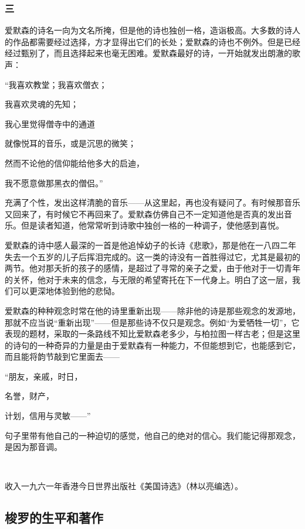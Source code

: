 \subsubsection*{三}
\par 爱默森的诗名一向为文名所掩，但是他的诗也独创一格，造诣极高。大多数的诗人的作品都需要经过选择，方才显得出它们的长处；爱默森的诗也不例外。但是已经经过甄别了，而且选择起来也毫无困难。爱默森最好的诗，一开始就发出朗澈的歌声：
\par “我喜欢教堂；我喜欢僧衣；
\par 我喜欢灵魂的先知；
\par 我心里觉得僧寺中的通道
\par 就像悦耳的音乐，或是沉思的微笑；
\par 然而不论他的信仰能给他多大的启迪，
\par 我不愿意做那黑衣的僧侣。”
\par 充满了个性，发出这样清脆的音乐——从这里起，再也没有疑问了。有时候那音乐又回来了，有时候它不再回来了。爱默森仿佛自己不一定知道他是否真的发出音乐。但是读者知道，他常常听到诗歌中独创一格的一种调子，使他感到喜悦。
\par 爱默森的诗中感人最深的一首是他追悼幼子的长诗《悲歌》，那是他在一八四二年失去一个五岁的儿子后挥泪完成的。这一类的诗没有一首胜得过它，尤其是最初的两节。他对那夭折的孩子的感情，是超过了寻常的亲子之爱，由于他对于一切青年的关怀，他对于未来的信念，与无限的希望寄托在下一代身上。明白了这一层，我们可以更深地体验到他的悲恸。
\par 爱默森的种种观念时常在他的诗里重新出现——除非他的诗是那些观念的发源地，那就不应当说“重新出现”——但是那些诗不仅只是观念。例如“为爱牺牲一切”，它表现的题材，采取的一条路线不知比爱默森老多少，与柏拉图一样古老；但是这里的诗句的一种奇异的力量是由于爱默森有一种能力，不但能想到它，也能感到它，而且能将韵节敲到它里面去——
\par “朋友，亲戚，时日，
\par 名誉，财产，
\par 计划，信用与灵敏——”
\par 句子里带有他自己的一种迫切的感觉，他自己的绝对的信心。我们能记得那观念，是因为那音调。
\par  
\par *收入一九六一年香港今日世界出版社《美国诗选》（林以亮编选）。



\subsection{梭罗的生平和著作}


